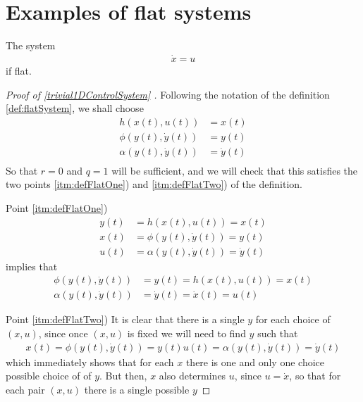 \documentclass[12pt]{article}
\begin{document}
\section{Examples of flat systems}

\begin{example}\label{trivial1DControlSystem}
  The system
  \begin{equation}\begin{aligned}
    \dot{x} = u
  \end{aligned}\end{equation}
  if flat.
\end{example}
\begin{proof}[ Proof  of \ref{trivial1DControlSystem} ]
  Following the notation of the definition \ref{def:flatSystem}, we shall choose
  \begin{equation}\begin{aligned}
    h(x(t),u(t)) &= x(t) \\
    \phi(y(t),\dot{y}(t)) &= y(t) \\
    \alpha(y(t),\dot{y}(t)) &= \dot{y}(t) \\
  \end{aligned}\end{equation}
  So that $r=0$ and $q=1$ will be sufficient, and we will check that this satisfies the two points \ref{itm:defFlatOne}) and \ref{itm:defFlatTwo}) of the definition.
  
  Point \ref{itm:defFlatOne})
  \begin{equation}\begin{aligned}
    y(t) &= h(x(t),u(t)) = x(t) \\
    x(t) &= \phi(y(t),\dot{y}(t)) = y(t) \\
    u(t) &= \alpha(y(t),\dot{y}(t)) = \dot{y}(t)
  \end{aligned}\end{equation}
  implies that
  \begin{equation}\begin{aligned}
    \phi(y(t),\dot{y}(t)) &= y(t) = h(x(t),u(t)) = x(t) \\
    \alpha(y(t),\dot{y}(t)) &= \dot{y}(t) = \dot{x}(t) = u(t)
  \end{aligned}\end{equation}
  
  Point \ref{itm:defFlatTwo}) It is clear that there is a single $y$ for each choice of $(x,u)$, since once $(x,u)$ is fixed we will need to find $y$ such that
  \begin{equation}\begin{aligned}
    x(t) = \phi(y(t),\dot{y}(t)) = y(t)
    u(t) = \alpha(y(t),\dot{y}(t)) = \dot{y}(t)
  \end{aligned}\end{equation}
  which immediately shows that for each $x$ there is one and only one
  choice possible choice of of $y$. But then, $x$ also determines $u$,
  since $u=\dot{x}$, so that for each pair $(x,u)$ there is a single 
  possible $y$
  
\end{proof}
\end{document}
